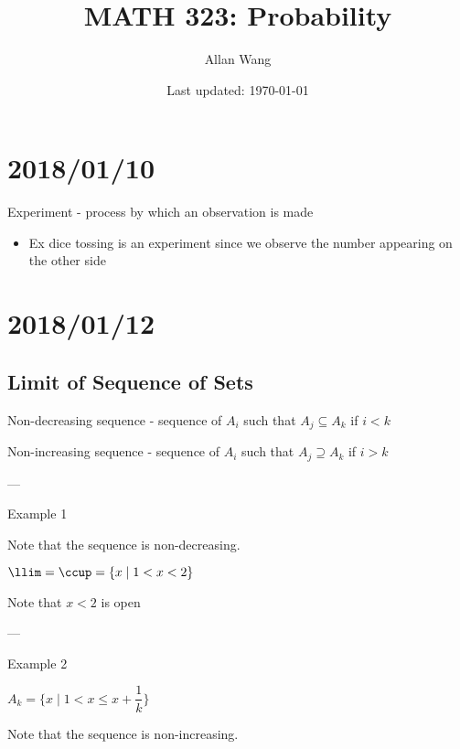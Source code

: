 \documentclass[12 pt]{article}
\author{Allan Wang}
\date{Last updated: \today}
\title{MATH 323: Probability}
\newcommand{\ddef}[1]{#1}
\begin{document}
\onehalfspacing
\maketitle
\tableofcontents
\pagebreak
\section{2018/01/10}

\ddef{Experiment - process by which an observation is made}

\begin{itemize}
    \item Ex dice tossing is an experiment since we observe the number appearing on the other side
\end{itemize}

\section{2018/01/12}

\subsection{Limit of Sequence of Sets}

\ddef{Non-decreasing sequence - sequence of \(A_i\) such that \(A_j \subseteq A_k\) if \(i < k\)}

\ddef{Non-increasing sequence - sequence of \(A_i\) such that \(A_j \supseteq A_k\) if \(i > k\)}

---

Example 1


Note that the sequence is non-decreasing.

\(\llim = \ccup = \{x \mid 1 < x < 2\}\)

Note that \(x < 2\) is open

---

Example 2

\(A_k = \{x \mid 1 < x \le x + \dfrac{1}{k}\}\)

Note that the sequence is non-increasing.
\end{document}
